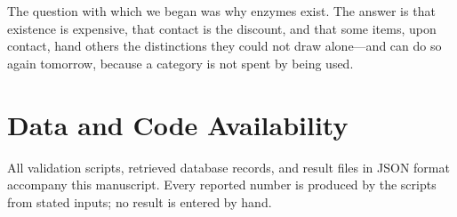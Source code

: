 \documentclass[11pt,twocolumn,a4paper]{article}
\theoremstyle{plain}
\theoremstyle{definition}
\theoremstyle{remark}
\begin{document}
The question with which we began was why enzymes exist. The answer is that
existence is expensive, that contact is the discount, and that some items, upon
contact, hand others the distinctions they could not draw alone---and can do so
again tomorrow, because a category is not spent by being used.

\section*{Data and Code Availability}
\label{sec:data-availability}

All validation scripts, retrieved database records, and result files in JSON
format accompany this manuscript. Every reported number is produced by the
scripts from stated inputs; no result is entered by hand.



\end{document}
